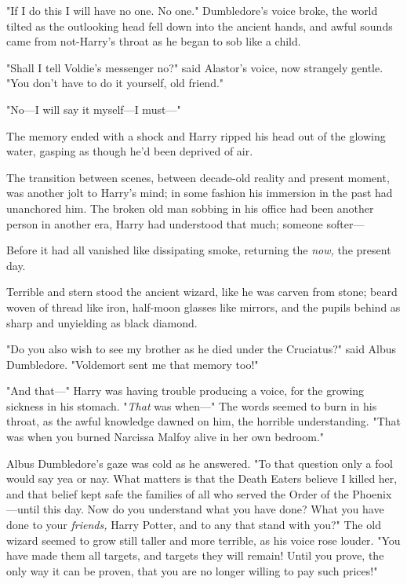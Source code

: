 \begin{em}
"If I do this I will have no one. No one." Dumbledore’s voice broke, the
world tilted as the outlooking head fell down into the ancient hands, and awful
sounds came from not-Harry’s throat as he began to sob like a child.

"Shall I tell Voldie’s messenger no?" said Alastor’s voice, now strangely
gentle. "You don’t have to do it yourself, old friend."

"No—I will say it myself—I must—"
\end{em}
\later
The memory ended with a shock and Harry ripped his head out of the glowing
water, gasping as though he’d been deprived of air.

The transition between scenes, between decade-old reality and present moment,
was another jolt to Harry’s mind; in some fashion his immersion in the past had
unanchored him. The broken old man sobbing in his office had been another
person in another era, Harry had understood that much; someone softer—

Before it had all vanished like dissipating smoke, returning the \emph{now,}
the present day.

Terrible and stern stood the ancient wizard, like he was carven from stone;
beard woven of thread like iron, half-moon glasses like mirrors, and the pupils
behind as sharp and unyielding as black diamond.

"Do you also wish to see my brother as he died under the Cruciatus?" said Albus
Dumbledore. "Voldemort sent me that memory too!"

"And that—" Harry was having trouble producing a voice, for the growing
sickness in his stomach. "\emph{That} was when—" The words seemed to burn in
his throat, as the awful knowledge dawned on him, the horrible understanding.
"That was when you burned Narcissa Malfoy alive in her own bedroom."

Albus Dumbledore’s gaze was cold as he answered. "To that question only a fool
would say yea or nay. What matters is that the Death Eaters believe I killed
her, and that belief kept safe the families of all who served the Order of the
Phoenix—until this day. Now do you understand what you have done? What you
have done to your \emph{friends,} Harry Potter, and to any that stand with
you?" The old wizard seemed to grow still taller and more terrible, as his
voice rose louder. "You have made them all targets, and targets they will
remain! Until you prove, the only way it can be proven, that you are no longer
willing to pay such prices!"

